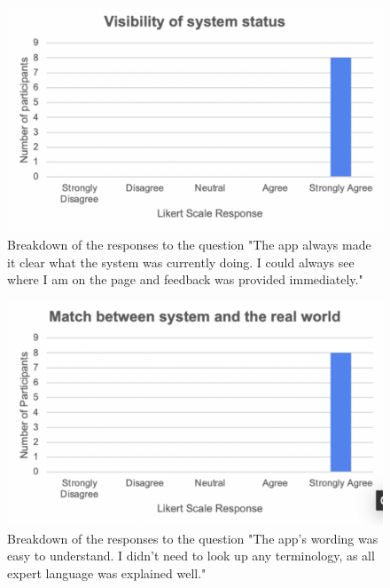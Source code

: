 \documentclass{l4proj}
\begin{document}
\begin{appendices}
\begin{figure}[H]
    \begin{centering}
    \includegraphics[scale=0.5]{images/heuristic1.pdf}
    \caption{Breakdown of the responses to the question "The app always made it clear what the system was currently doing. I could always see where I am on the page and feedback was provided immediately."}
    \label{fig: heuristic1}
    \end{centering}
\end{figure}

\begin{figure}[H]
    \begin{centering}
    \includegraphics[scale=0.5]{images/heuristic2.pdf}
    \caption{Breakdown of the responses to the question "The app's wording was easy to understand. I didn't need to look up any terminology, as all expert language was explained well."}
    \label{fig: heuristic2}
    \end{centering}
\end{figure}


\end{appendices}
\end{document}
